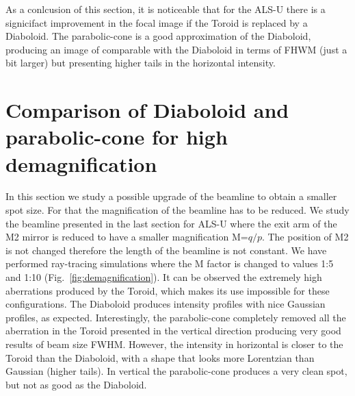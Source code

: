 \documentclass[a4paper, 11pt]{article}
\begin{document}
As a conlcusion of this section, it is noticeable that for the ALS-U there is a signicifact improvement in the focal image if the Toroid is replaced by a Diaboloid. The parabolic-cone is a good approximation of the Diaboloid, producing an image of comparable with the Diaboloid in terms of FHWM (just a bit larger) but presenting higher tails in the horizontal intensity. 

\section{Comparison of Diaboloid and parabolic-cone for high demagnification}

In this section we study a possible upgrade of the beamline to obtain a smaller spot size. For that the magnification of the beamline has to be reduced. We study the beamline presented in the last section for ALS-U where the exit arm of the M2 mirror is reduced to have a smaller magnification M=$q/p$. The position of M2 is not changed therefore the length of the beamline is not constant. We have performed ray-tracing simulations where the M factor is changed to values 1:5 and 1:10 (Fig.~\ref{fig:demagnification}). It can be observed the extremely high aberrations produced by the Toroid, which makes its use impossible for these configurations. The Diaboloid produces intensity profiles with nice Gaussian profiles, as expected. Interestingly, the parabolic-cone completely removed all the aberration in the Toroid presented in the vertical direction producing very good results of beam size FWHM. However, the intensity in horizontal is closer to the Toroid than the Diaboloid, with a shape that looks more Lorentzian than Gaussian (higher tails). In vertical the parabolic-cone produces a very clean spot, but not as good as the Diaboloid. 
\end{document}
